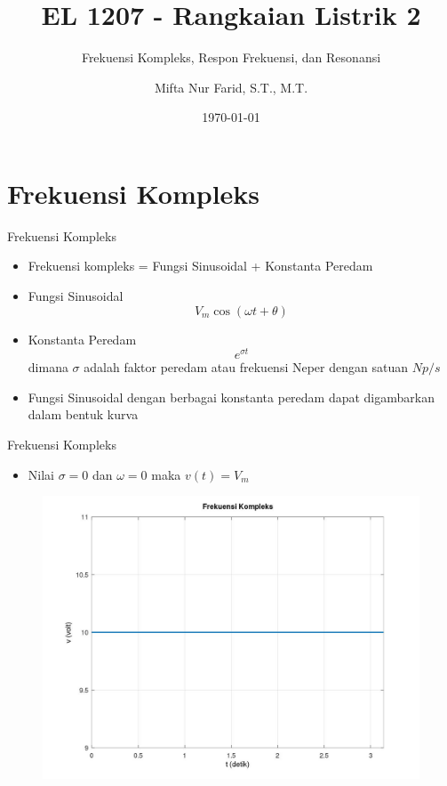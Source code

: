 \documentclass[10pt]{beamer}
\title{EL 1207 - Rangkaian Listrik 2}
\subtitle{Frekuensi Kompleks, Respon Frekuensi, dan Resonansi}
\date{\today}
\author{Mifta Nur Farid, S.T., M.T.}
\institute{Teknik Elektro - Institut Teknologi Kalimantan \\ Karang Joang, Balikpapan}
\begin{document}
\maketitle

\section{Frekuensi Kompleks}

\begin{frame}{Frekuensi Kompleks}
    \begin{itemize}
        \item Frekuensi kompleks = Fungsi Sinusoidal + Konstanta Peredam
        \item Fungsi Sinusoidal $$ V_m \cos(\omega t + \theta) $$
        \item Konstanta Peredam $$ e^{\sigma t} $$ dimana $\sigma$ adalah faktor peredam atau frekuensi Neper dengan satuan $Np/s$
        \item Fungsi Sinusoidal dengan berbagai konstanta peredam dapat digambarkan dalam bentuk kurva
    \end{itemize}    
\end{frame}

\begin{frame}{Frekuensi Kompleks}
    \begin{itemize}
        \item Nilai $ \sigma = 0 $ dan $ \omega = 0 $ maka $ v(t) = V_m $
    \end{itemize}
    
    \begin{figure}
        \includegraphics[width=0.8\linewidth]{gambar1.jpg}
    \end{figure}
\end{frame}
\end{document}
